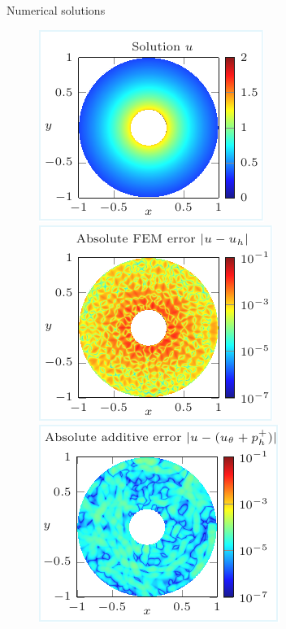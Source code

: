 \begin{frame}{Numerical solutions}
	\vspace{-8pt}
	\begin{figure}[!ht] \centering
		\includegraphics[width=0.31\linewidth]{images/numeric/poisson/mixed/plots/solution.pdf}		
		\includegraphics[width=0.31\linewidth]{images/numeric/poisson/mixed/plots/error_FEM.pdf}	
		\includegraphics[width=0.31\linewidth]{images/numeric/poisson/mixed/plots/error_ADD.pdf}	
	\end{figure}


\end{frame}